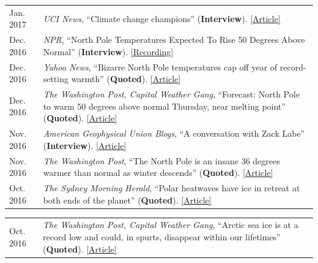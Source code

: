 \documentclass[margin,line,palatino,courier,10pt]{res}
\begin{document}
\begin{resume}
\begin{tabular}{@{}p{0.9in}p{4in}}
Jan. 2017 & \textit{UCI News}, ``Climate change champions'' (\textbf{Interview}). \href{https://news.uci.edu/climate-change-champions/}{[Article]}\\
Dec. 2016 & \textit{NPR}, ``North Pole Temperatures Expected To Rise 50 Degrees Above Normal'' (\textbf{Interview}). \href{http://www.npr.org/2016/12/21/506483966/north-pole-temperatures-expected-to-rise-50-degrees-above-normal}{[Recording]}\\
Dec. 2016 & \textit{Yahoo News}, ``Bizarre North Pole temperatures cap off year of record-setting warmth'' (\textbf{Quoted}). \href{https://www.yahoo.com/news/bizarre-north-pole-temperatures-cap-off-year-of-record-setting-warmth-181727978.html?soc_src=social-sh&soc_trk=tw}{[Article]}\\
Dec. 2016 & \textit{The Washington Post, Capital Weather Gang}, ``Forecast: North Pole to warm 50 degrees above normal Thursday, near melting point'' (\textbf{Quoted}). \href{https://www.washingtonpost.com/news/capital-weather-gang/wp/2016/12/20/forecast-north-pole-to-warm-50-degrees-above-normal-thursday-near-melting-point/?dfgdfgdfgdfg&utm_term=.e648369ada7e}{[Article]}\\
Nov. 2016 & \textit{American Geophysical Union Blogs}, ``A conversation with Zack Labe'' (\textbf{Interview}). \href{http://blogs.agu.org/mountainbeltway/2016/11/23/conversation-zack-labe/}{[Article]}\\
Nov. 2016 & \textit{The Washington Post}, ``The North Pole is an insane 36 degrees warmer than normal as winter descends'' (\textbf{Quoted}). \href{https://www.washingtonpost.com/news/energy-environment/wp/2016/11/17/the-north-pole-is-an-insane-36-degrees-warmer-than-normal-as-winter-descends/?utm_term=.f2cb9596b3d8}{[Article]}\\
Oct. 2016 & \textit{The Sydney Morning Herald}, ``Polar heatwaves have ice in retreat at both ends of the planet'' (\textbf{Quoted}). \href{http://www.smh.com.au/environment/climate-change/polar-heatwaves-have-ice-in-retreat-at-both-ends-of-the-planet-20161030-gse9q6.html}{[Article]}\\
\end{tabular}
\begin{tabular}{@{}p{0.9in}p{4in}}
Oct. 2016 & \textit{The Washington Post, Capital Weather Gang}, ``Arctic sea ice is at a record low and could, in spurts, disappear within our lifetimes'' (\textbf{Quoted}). \href{https://www.washingtonpost.com/news/capital-weather-gang/wp/2016/10/27/arctic-sea-ice-is-at-a-record-low-and-could-in-spurts-disappear-within-our-lifetimes/}{[Article]}\\

\end{tabular}
\end{resume}
\end{document}
